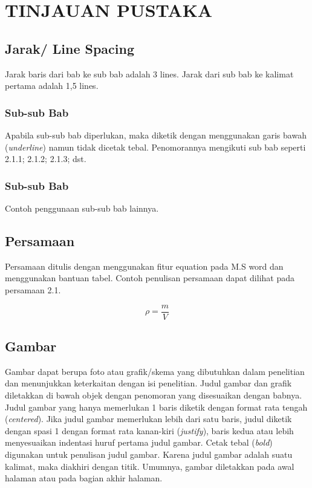 \chapter{TINJAUAN PUSTAKA}

\section{Jarak/ Line Spacing}
Jarak baris dari bab ke sub bab adalah 3 lines. Jarak dari sub bab ke kalimat pertama adalah 1,5 lines.

\subsection{Sub-sub Bab}
Apabila sub-sub bab diperlukan, maka diketik dengan menggunakan garis bawah (\textit{underline}) namun tidak dicetak tebal. Penomorannya mengikuti sub bab seperti 2.1.1; 2.1.2; 2.1.3; dst.

\subsection{Sub-sub Bab}
Contoh penggunaan sub-sub bab lainnya.

\section{Persamaan}
Persamaan ditulis dengan menggunakan fitur equation pada M.S word dan menggunakan bantuan tabel. Contoh penulisan persamaan dapat dilihat pada persamaan 2.1.

\begin{equation}
    \rho = \frac{m}{V}
    \label{eq:rho}
\end{equation}

\section{Gambar}
Gambar dapat berupa foto atau grafik/skema yang dibutuhkan dalam penelitian dan menunjukkan keterkaitan dengan isi penelitian. Judul gambar dan grafik diletakkan di bawah objek dengan penomoran yang disesuaikan dengan babnya. Judul gambar yang hanya memerlukan 1 baris diketik dengan format rata tengah (\textit{centered}). Jika judul gambar memerlukan lebih dari satu baris, judul diketik dengan spasi 1 dengan format rata kanan-kiri (\textit{justify}), baris kedua atau lebih menyesuaikan indentasi huruf pertama judul gambar. Cetak tebal (\textit{bold}) digunakan untuk penulisan judul gambar. Karena judul gambar adalah suatu kalimat, maka diakhiri dengan titik. Umumnya, gambar diletakkan pada awal halaman atau pada bagian akhir halaman.

